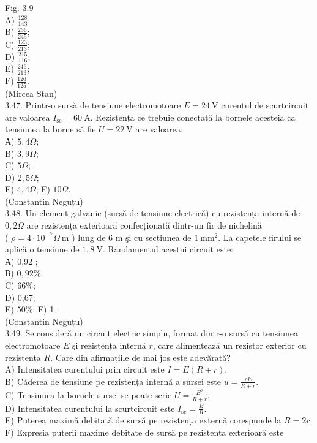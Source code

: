 \documentclass[10pt]{article}
\begin{document}
Fig. 3.9\\
A) $\frac{128}{143}$;\\
B) $\frac{236}{245}$;\\
C) $\frac{123}{213}$;\\
D) $\frac{215}{116}$;\\
E) $\frac{246}{213}$;\\
F) $\frac{126}{125}$.\\
(Mircea Stan)\\
3.47. Printr-o sursă de tensiune electromotoare $E=24 \mathrm{~V}$ curentul de scurtcircuit are valoarea $I_{\mathrm{sc}}=60 \mathrm{~A}$. Rezistența ce trebuie conectată la bornele acesteia ca tensiunea la borne să fie $U=22 \mathrm{~V}$ are valoarea:\\
А) $5,4 \Omega$;\\
B) $3,9 \Omega$;\\
C) $5 \Omega$;\\
D) $2,5 \Omega$;\\
E) $4,4 \Omega$; F) $10 \Omega$.\\
(Constantin Neguțu)\\
3.48. Un element galvanic (sursă de tensiune electrică) cu rezistența internă de $0,2 \Omega$ are rezistența exterioară confecționată dintr-un fir de nichelină\\
( $\rho=4 \cdot 10^{-7} \Omega \mathrm{~m}$ ) lung de 6 m şi cu secțiunea de $1 \mathrm{~mm}^{2}$. La capetele firului se aplică o tensiune de $1,8 \mathrm{~V}$. Randamentul acestui circuit este:\\
А) 0,92 ;\\
В) $0,92 \%$;\\
C) $66 \%$;\\
D) 0,67;\\
E) $50 \%$; F) 1 .\\
(Constantin Neguțu)\\
3.49. Se consideră un circuit electric simplu, format dintr-o sursă cu tensiunea electromotoare $E$ şi rezistența internă $r$, care alimentează un rezistor exterior cu rezistența $R$. Care din afirmațiile de mai jos este adevărată?\\
A) Intensitatea curentului prin circuit este $I=E(R+r)$.\\
B) Cáderea de tensiune pe rezistența internă a sursei este $u=\frac{r E}{R+r}$.\\
C) Tensiunea la bornele sursei se poate scrie $U=\frac{E^{2}}{R+r}$.\\
D) Intensitatea curentului la scurtcircuit este $I_{\mathrm{sc}}=\frac{E}{R}$.\\
E) Puterea maximă debitată de sursă pe rezistența externă corespunde la $R=2 r$.\\
F) Expresia puterii maxime debitate de sursă pe rezistenta exterioară este
\end{document}
